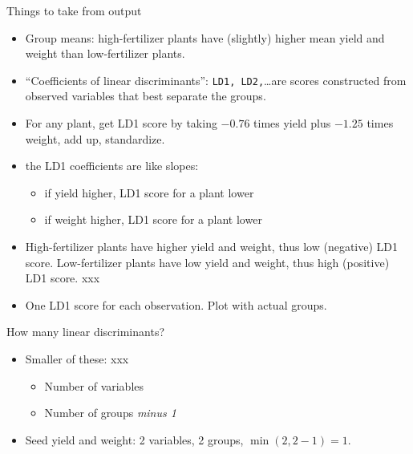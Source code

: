 \documentclass[ignorenonframetext,]{beamer}
\providecommand{\tightlist}{%
  \setlength{\itemsep}{0pt}\setlength{\parskip}{0pt}}
\begin{document}
\begin{frame}{Things to take from output}
\protect\hypertarget{things-to-take-from-output}{}

\begin{itemize}
\item
  Group means: high-fertilizer plants have (slightly) higher mean yield
  and weight than low-fertilizer plants.
\item
  ``Coefficients of linear discriminants'': \texttt{LD1,
  LD2,}\ldots are scores constructed from observed variables that best
  separate the groups.
\item
  For any plant, get LD1 score by taking \(-0.76\) times yield plus
  \(-1.25\) times weight, add up, standardize.
\item
  the LD1 coefficients are like slopes:

  \begin{itemize}
  \tightlist
  \item
    if yield higher, LD1 score for a plant lower
  \item
    if weight higher, LD1 score for a plant lower
  \end{itemize}
\item
  High-fertilizer plants have higher yield and weight, thus low
  (negative) LD1 score. Low-fertilizer plants have low yield and weight,
  thus high (positive) LD1 score. xxx
\item
  One LD1 score for each observation. Plot with actual groups.
\end{itemize}

\end{frame}

\begin{frame}{How many linear discriminants?}
\protect\hypertarget{how-many-linear-discriminants}{}

\begin{itemize}
\item
  Smaller of these: xxx

  \begin{itemize}
  \item
    Number of variables
  \item
    Number of groups \emph{minus 1}
  \end{itemize}
\item
  Seed yield and weight: 2 variables, 2 groups, \(\min(2,2-1)=1\).
\end{itemize}

\end{frame}
\end{document}
